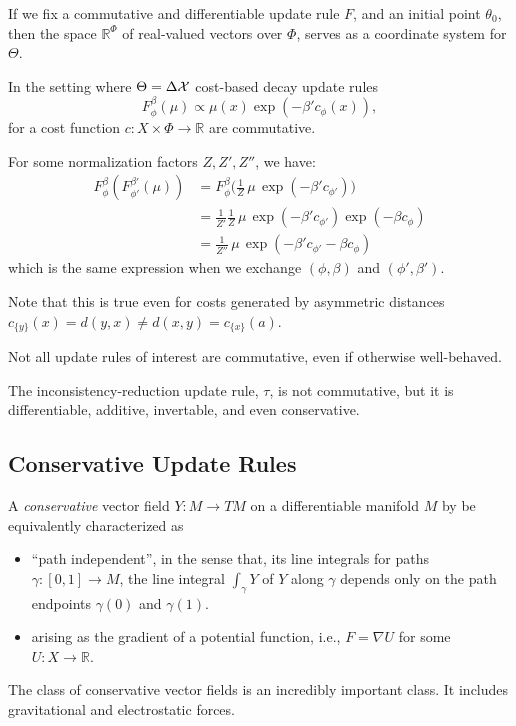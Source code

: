\documentclass{article}
\begin{document}
If we fix a commutative and differentiable update rule $F$, and an initial point $\theta_0$, then the space $\mathbb R^\Phi$ of real-valued vectors over $\Phi$,
serves as a coordinate system for $\Theta$.


\begin{prop}
    In the setting where $\Theta = \Delta\mathcal X$
    cost-based decay update rules
    \[
        F^{\beta}_\phi(\mu) \propto \mu(x) \exp(- \beta' c_{\phi}(x)),
    \]
    for a cost function $c : X \times \Phi \to \mathbb R$
    are commutative.
\end{prop}
\begin{lproof}
    For some normalization factors $Z, Z', Z''$, we have:
    \begin{align*}
         F^\beta_\phi( F^{\beta'}_{\phi'}(\mu))
         &= F^\beta_\phi \Big( \frac{1}{Z} \,\mu\, \exp(- \beta' c_{\phi'}) \Big) \\
         &= \frac{1}{Z'} \frac{1}{Z} \,\mu\, \exp(- \beta' c_{\phi'}) \exp(- \beta c_{\phi}) \\
         &= \frac{1}{Z''} \,\mu\, \exp(-\beta' c_{\phi'} - \beta c_\phi)
    \end{align*}
    which is the same expression when we exchange $(\phi, \beta)$ and $(\phi', \beta')$.
\end{lproof}

Note that this is true even for costs generated by asymmetric distances $c_{\{y\}}(x) = d(y, x) \ne d(x,y) = c_{\{x\}}(a)$.

Not all update rules of interest are commutative, even if otherwise well-behaved.

\begin{example}
    The inconsistency-reduction update rule, $\tau$, is not commutative, but it is differentiable, additive, invertable, and even conservative.
\end{example}


\subsection{Conservative Update Rules}

A \emph{conservative} vector field $Y : M \to T M$ on a differentiable manifold $M$ by be equivalently characterized as
\begin{itemize}
    \item ``path independent'', in the sense that, its line integrals for paths $\gamma : [0,1] \to M$, the line integral
    $\int_\gamma Y$ of $Y$ along $\gamma$
     depends only on the path endpoints $\gamma(0)$ and $\gamma(1)$.
    \item
        arising as the gradient of a potential function, i.e., $F = \nabla U$ for some $U : X \to \mathbb R$.
\end{itemize}
The class of conservative vector fields is an incredibly important class.
It includes gravitational and electrostatic forces.
\end{document}

